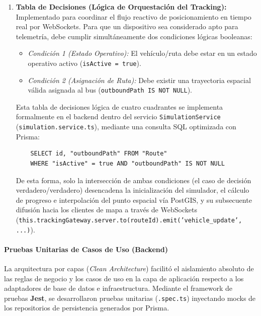 \begin{enumerate}
\begin{itemize}
    \end{itemize}
    \item \textbf{Tabla de Decisiones (Lógica de Orquestación del Tracking):} Implementado para coordinar el flujo reactivo de posicionamiento en tiempo real por WebSockets. Para que un dispositivo sea considerado apto para telemetría, debe cumplir simultáneamente dos condiciones lógicas booleanas:
    \begin{itemize}
        \item \textit{Condición 1 (Estado Operativo):} El vehículo/ruta debe estar en un estado operativo activo (\texttt{isActive = true}).
        \item \textit{Condición 2 (Asignación de Ruta):} Debe existir una trayectoria espacial válida asignada al bus (\texttt{outboundPath IS NOT NULL}).
    \end{itemize}
    Esta tabla de decisiones lógica de cuatro cuadrantes se implementa formalmente en el backend dentro del servicio \texttt{SimulationService} (\texttt{simulation.service.ts}), mediante una consulta SQL optimizada con Prisma:
    \begin{verbatim}
    SELECT id, "outboundPath" FROM "Route" 
    WHERE "isActive" = true AND "outboundPath" IS NOT NULL
    \end{verbatim}
    De esta forma, solo la intersección de ambas condiciones (el caso de decisión verdadero/verdadero) desencadena la inicialización del simulador, el cálculo de progreso e interpolación del punto espacial vía PostGIS, y su subsecuente difusión hacia los clientes de mapa a través de WebSockets (\texttt{this.trackingGateway.}\allowbreak\texttt{server.to(routeId).}\allowbreak\texttt{emit('vehicle\_update', ...)}).
\end{enumerate}

\paragraph{Pruebas Unitarias de Casos de Uso (Backend)}
La arquitectura por capas (\textit{Clean Architecture}) facilitó el aislamiento absoluto de las reglas de negocio y los casos de uso en la capa de aplicación respecto a los adaptadores de base de datos e infraestructura. Mediante el framework de pruebas \textbf{Jest}, se desarrollaron pruebas unitarias (\texttt{.spec.ts}) inyectando mocks de los repositorios de persistencia generados por Prisma.

